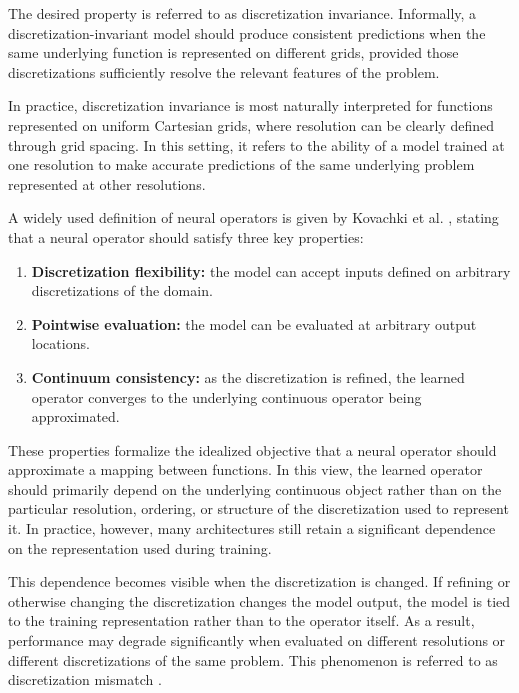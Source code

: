 The desired property is referred to as discretization invariance. Informally, a discretization\hyp{}invariant model should produce consistent predictions when the same underlying function is represented on different grids, provided those discretizations sufficiently resolve the relevant features of the problem.

In practice, discretization invariance is most naturally interpreted for functions represented on uniform Cartesian grids, where resolution can be clearly defined through grid spacing. In this setting, it refers to the ability of a model trained at one resolution to make accurate predictions of the same underlying problem represented at other resolutions.

A widely used definition of neural operators is given by Kovachki et al. \cite{neural-operators}, stating that a neural operator should satisfy three key properties:

\begin{enumerate}
    \item \textbf{Discretization flexibility:} the model can accept inputs defined on arbitrary discretizations of the domain.
    
    \item \textbf{Pointwise evaluation:} the model can be evaluated at arbitrary output locations.
    
    \item \textbf{Continuum consistency:} as the discretization is refined, the learned operator converges to the underlying continuous operator being approximated.
\end{enumerate}

These properties formalize the idealized objective that a neural operator should approximate a mapping between functions. In this view, the learned operator should primarily depend on the underlying continuous object rather than on the particular resolution, ordering, or structure of the discretization used to represent it. In practice, however, many architectures still retain a significant dependence on the representation used during training.

This dependence becomes visible when the discretization is changed. If refining or otherwise changing the discretization changes the model output, the model is tied to the training representation rather than to the operator itself. As a result, performance may degrade significantly when evaluated on different resolutions or different discretizations of the same problem. This phenomenon is referred to as discretization mismatch \cite{gao-discretization-invariance}.

